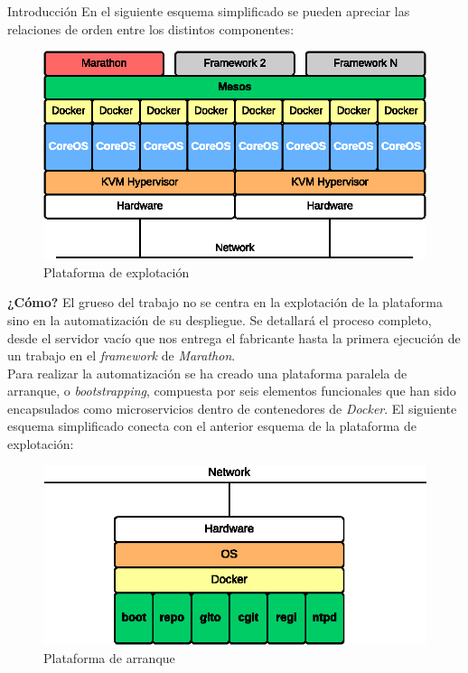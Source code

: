 \documentclass[a4paper,12pt,spanish,final]{epsc_tfc_pfc}
\begin{document}
\begin{intro}{Introducción}
En el siguiente esquema simplificado se pueden apreciar las relaciones de orden entre los distintos componentes:\\

\begin{figure}[h]
  \centering
    \includegraphics[scale=1]{plataforma}
      \caption{Plataforma de explotación}
\end{figure}

\textbf{¿Cómo?} El grueso del trabajo no se centra en la explotación de la plataforma sino en la automatización de su despliegue. Se detallará el proceso completo, desde el servidor vacío que nos entrega el fabricante hasta la primera ejecución de un trabajo en el \emph{framework} de \emph{Marathon}.\\

Para realizar la automatización se ha creado una plataforma paralela de arranque, o \emph{bootstrapping}, compuesta por seis elementos funcionales que han sido encapsulados como microservicios dentro de contenedores de \emph{Docker}. El siguiente esquema simplificado conecta con el anterior esquema de la plataforma de explotación:

\begin{figure}[h]
  \centering
    \includegraphics[scale=1]{boot_platform}
      \caption{Plataforma de arranque}
\end{figure}


\end{intro}
\end{document}
